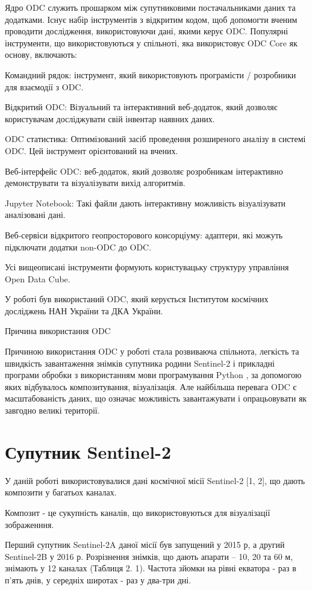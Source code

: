 Ядро ODC служить прошарком між супутниковими постачальниками даних та додатками. Існує набір інструментів з відкритим кодом, щоб допомогти вченим проводити дослідження, використовуючи дані, якими керує ODC. Популярні інструменти, що використовуються у спільноті, яка використовує ODC Core як основу, включають:

Командний рядок: інструмент, який використовують програмісти / розробники для взаємодії з ODC.

Відкритий ODC: Візуальний та інтерактивний веб-додаток, який дозволяє користувачам досліджувати свій інвентар наявних даних.

ODC статистика: Оптимізований засіб проведення розширеного аналізу в системі ODC. Цей інструмент орієнтований на вчених.

Веб-інтерфейс ODC: веб-додаток, який дозволяє розробникам інтерактивно демонструвати та візуалізувати вихід алгоритмів.

Jupyter Notebook: Такі файли дають інтерактивну можливість візуалізувати аналізовані дані.

Веб-сервіси відкритого геопросторового консорціуму: адаптери, які можуть підключати додатки non-ODC до ODC.

Усі вищеописані інструменти формують користувацьку структуру управління Open Data Cube.

У роботі був використаний ODC, який керується Інститутом космічних досліджень НАН України та ДКА України.

Причина використання ODC

Причиною використання ODC у роботі стала розвиваюча спільнота, легкість та швидкість завантаження знімків супутника родини Sentinel-2 і прикладні програми обробки з використанням мови програмування Python \cite{ref10}, за допомогою яких відбувалось композитування, візуалізація. Але найбільша перевага ODC є масштабованість даних, що означає можливість завантажувати і опрацьовувати як завгодно великі території.

\section{Супутник Sentinel-2}
У даній роботі використовувалися дані космічної місії Sentinel-2 [1, 2], що дають композити у багатьох каналах.

Композит \cite{ref15} - це сукупність каналів, що використовуються для візуалізації зображенння.

Перший супутник Sentinel-2A даної місії був запущений у 2015 р, а другий Sentinel-2B у 2016 р. Розрізнення знімків, що дають апарати -- 10, 20 та 60 м, знімають у 12 каналах (Таблиця 2. 1). Частота зйомки на рівні екватора - раз в п'ять днів, у середніх широтах - раз у два-три дні.

